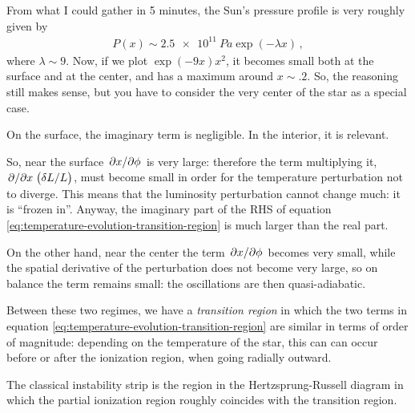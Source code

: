 \documentclass[main.tex]{subfiles}
\begin{document}
\begin{bluebox}
From what I could gather in 5 minutes, the Sun's pressure profile is very roughly given by 
%
\begin{align}
P(x) \sim \SI{2.5e11}{Pa} \exp( - \lambda x)
\,,
\end{align}
%
where \(\lambda \sim 9\). Now, if we plot \(\exp(-9x) x^2\), it becomes small both at the surface and at the center, and has a maximum around \(x \sim \num{.2}\).
So, the reasoning still makes sense, but you have to consider the very center of the star as a special case.
\end{bluebox}

On the surface, the imaginary term is negligible. In the interior, it is relevant.

So, near the surface \(\pdv*{x}{\phi }\) is very large: therefore the term multiplying it, \(\pdv*{}{x} \qty(\delta L / L)\), must become small in order for the temperature perturbation not to diverge. This means that the luminosity perturbation cannot change much: it is ``frozen in''. 
Anyway, the imaginary part of the RHS of equation \eqref{eq:temperature-evolution-transition-region} is much larger than the real part.

On the other hand, near the center the term \(\pdv*{x}{\phi }\) becomes very small, while the spatial derivative of the perturbation does not become very large, so on balance the term remains small: the oscillations are then quasi-adiabatic.

Between these two regimes, we have a \emph{transition region} in which the two terms in equation \eqref{eq:temperature-evolution-transition-region} are similar in terms of order of magnitude: depending on the temperature of the star, this can can occur before or after the ionization region, when going radially outward.

The classical instability strip is the region in the Hertzsprung-Russell diagram in which the partial ionization region roughly coincides with the transition region. 


\end{document}
